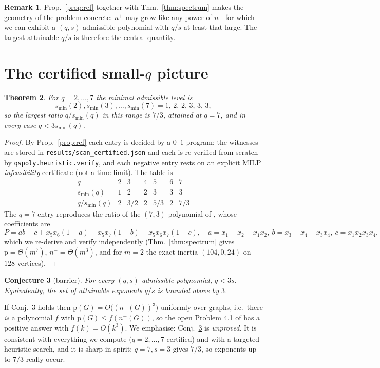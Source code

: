 \documentclass[11pt,a4paper]{article}
\theoremstyle{plain}
\newtheorem{theorem}{Theorem}[section]
\newtheorem{conjecture}[theorem]{Conjecture}
\theoremstyle{definition}
\newtheorem{remark}[theorem]{Remark}
\newcommand{\pp}{\mathrm{p}}
\begin{document}
\begin{remark}
Prop.~\ref{prop:ref} together with Thm.~\ref{thm:spectrum} makes the geometry of the
problem concrete: $n^+$ may grow like any power of $n^-$ for which we can exhibit a
$(q,s)$-admissible polynomial with $q/s$ at least that large.  The largest attainable
$q/s$ is therefore the central quantity.
\end{remark}

\section{The certified small-$q$ picture}
\label{sec:cert}

\begin{theorem}
\label{thm:cert}
For $q=2,\dots,7$ the minimal admissible level is
\[
s_{\min}(2),s_{\min}(3),\dots,s_{\min}(7)=1,\,2,\,2,\,3,\,3,\,3,
\]
so the largest ratio $q/s_{\min}(q)$ in this range is $7/3$, attained at $q=7$, and in
every case $q<3s_{\min}(q)$.
\end{theorem}

\begin{proof}
By Prop.~\ref{prop:ref} each entry is decided by a $0$--$1$ program; the witnesses are
stored in \texttt{results/scan\_certified.json} and each is re-verified from scratch by
\texttt{qspoly.heuristic.verify}, and each negative entry rests on an explicit MILP
\emph{infeasibility} certificate (not a time limit).  The table is
\[
\begin{array}{c|cccccc}
q&2&3&4&5&6&7\\ \hline
s_{\min}(q)&1&2&2&3&3&3\\
q/s_{\min}(q)&2&3/2&2&5/3&2&7/3
\end{array}
\]
The $q=7$ entry reproduces the ratio of the $(7,3)$ polynomial of
\cite{ElphickEtAl2026Inertia}, whose coefficients are
\[
P=ab-c+x_5x_6(1-a)+x_5x_7(1-b)-x_5x_6x_7(1-c),
\quad a=x_1+x_2-x_1x_2,\ b=x_3+x_4-x_3x_4,\ c=x_1x_2x_3x_4,
\]
which we re-derive and verify independently
(Thm.~\ref{thm:spectrum} gives $\pp=\Theta(m^7)$, $n^-=\Theta(m^3)$, and for
$m=2$ the exact inertia $(104,0,24)$ on $128$ vertices).
\end{proof}

\begin{conjecture}[barrier]
\label{conj:barrier}
For every $(q,s)$-admissible polynomial, $q<3s$.  Equivalently, the set of attainable
exponents $q/s$ is bounded above by $3$.
\end{conjecture}

If \textup{Conj.~\ref{conj:barrier}} holds then $\pp(G)=O\big((n^-(G))^3\big)$ uniformly
over graphs, i.e.\ there \emph{is} a polynomial $f$ with $\pp(G)\le f(n^-(G))$, so the
open Problem 4.1 of \cite{ElphickEtAl2026Inertia} has a positive answer with
$f(k)=O(k^3)$.  We emphasise: \textup{Conj.~\ref{conj:barrier}} is \emph{unproved}.  It is
consistent with everything we compute ($q=2,\dots,7$ certified) and with a targeted
heuristic search, and it is sharp in spirit: $q=7,s=3$ gives $7/3$, so exponents up to
$7/3$ really occur.
\end{document}
